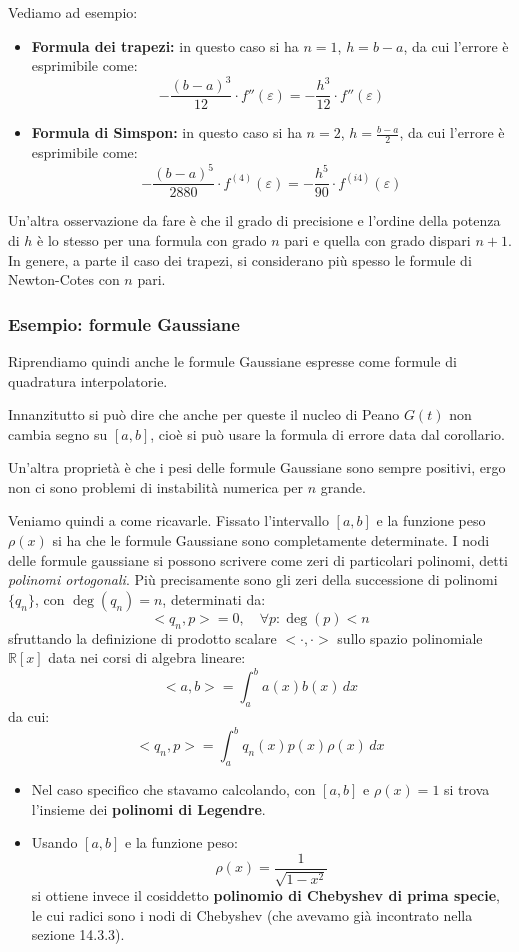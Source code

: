 \documentclass[a4paper,11pt]{article}
\begin{document}
Vediamo ad esempio:
\begin{itemize}
	\item \textbf{Formula dei trapezi:} in questo caso si ha $n = 1$, $h = b - a$, da cui l'errore è esprimibile come:
		$$
		- \frac{(b - a)^3}{12} \cdot f''(\varepsilon) = -\frac{h^3}{12} \cdot f''(\varepsilon)
		$$
	\item \textbf{Formula di Simspon:} in questo caso si ha $n = 2$, $h = \frac{b - a}{2}$, da cui l'errore è esprimibile come:
		$$
		- \frac{(b - a)^5}{2880} \cdot f^{(4)}(\varepsilon) = -\frac{h^5}{90} \cdot f^{(i4)}(\varepsilon)
		$$
\end{itemize}

Un'altra osservazione da fare è che il grado di precisione e l'ordine della potenza di $h$ è lo stesso per una formula con grado $n$ pari e quella con grado dispari $n + 1$.
In genere, a parte il caso dei trapezi, si considerano più spesso le formule di Newton-Cotes con $n$ pari.

\subsubsection{Esempio: formule Gaussiane}
Riprendiamo quindi anche le formule Gaussiane espresse come formule di quadratura interpolatorie.

Innanzitutto si può dire che anche per queste il nucleo di Peano $G(t)$ non cambia segno su $[a, b]$, cioè si può usare la formula di errore data dal corollario.

Un'altra proprietà è che i pesi delle formule Gaussiane sono sempre positivi, ergo non ci sono problemi di instabilità numerica per $n$ grande.

Veniamo quindi a come ricavarle.
Fissato l'intervallo $[a, b]$ e la funzione peso $\rho(x)$ si ha che le formule Gaussiane sono completamente determinate.
I nodi delle formule gaussiane si possono scrivere come zeri di particolari polinomi, detti \textit{polinomi ortogonali}.
Più precisamente sono gli zeri della successione di polinomi $\{q_n\}$, con $\deg(q_n) = n$, determinati da:
$$
< q_n, p > = 0 , \quad \forall p : \deg(p) < n
$$
sfruttando la definizione di prodotto scalare $< \cdot , \cdot >$ sullo spazio polinomiale $\mathbb{R}[x]$ data nei corsi di algebra lineare:
$$
<a, b> = \int_a^b a(x) b(x) \, dx
$$
da cui:
$$
< q_n, p > = \int_a^b q_n(x) p(x) \rho(x) \, dx
$$

\begin{itemize}
	\item
		Nel caso specifico che stavamo calcolando, con $[a, b]$ e $\rho(x) = 1$ si trova l'insieme dei \textbf{polinomi di Legendre}.
	\item 
		Usando $[a, b]$ e la funzione peso:
		$$
		\rho(x) = \frac{1}{\sqrt{1 - x^2}}
		$$
		si ottiene invece il cosiddetto \textbf{polinomio di Chebyshev di prima specie}, le cui radici sono i nodi di Chebyshev (che avevamo già incontrato nella sezione 14.3.3).
\end{itemize}
\end{document}
